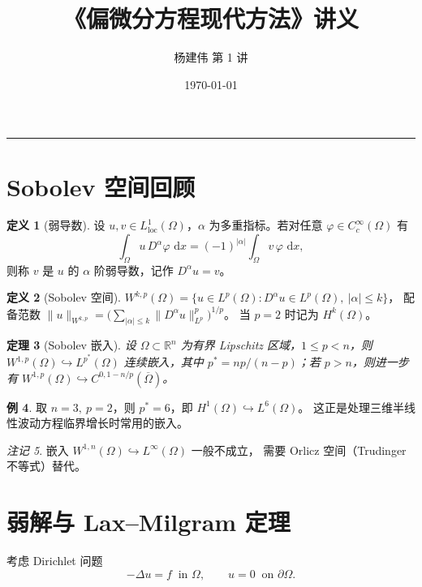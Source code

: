 \documentclass[11pt,a4paper,UTF8,fontset=fandol]{ctexart}
\title{《偏微分方程现代方法》讲义}
\author{杨建伟 \quad 第 1 讲}
\date{\today}
\newtheorem{theorem}{定理}[section]
\theoremstyle{definition}
\newtheorem{definition}[theorem]{定义}
\newtheorem{example}[theorem]{例}
\theoremstyle{remark}
\newtheorem{remark}[theorem]{注记}
\newcommand{\R}{\mathbb{R}}
\newcommand{\Om}{\Omega}
\newcommand{\Lp}[1]{L^{#1}}
\newcommand{\Hs}[1]{H^{#1}}
\newcommand{\dd}{\,\mathrm{d}}
\begin{document}
\maketitle

\tableofcontents
\bigskip\hrule\bigskip

\section{Sobolev 空间回顾}

\begin{definition}[弱导数]
设 $u,v\in L^1_{\mathrm{loc}}(\Om)$，$\alpha$ 为多重指标。若对任意
$\varphi\in C_c^\infty(\Om)$ 有
\begin{equation}\label{eq:weak-deriv}
  \int_{\Om} u\, D^\alpha\varphi\,\dd x
  = (-1)^{|\alpha|}\int_{\Om} v\,\varphi\,\dd x ,
\end{equation}
则称 $v$ 是 $u$ 的 $\alpha$ 阶弱导数，记作 $D^\alpha u=v$。
\end{definition}

\begin{definition}[Sobolev 空间]
$W^{k,p}(\Om)=\{u\in\Lp{p}(\Om): D^\alpha u\in\Lp{p}(\Om),\ |\alpha|\le k\}$，
配备范数 $\|u\|_{W^{k,p}}=\bigl(\sum_{|\alpha|\le k}\|D^\alpha u\|_{\Lp p}^p\bigr)^{1/p}$。
当 $p=2$ 时记为 $\Hs{k}(\Om)$。
\end{definition}

\begin{theorem}[Sobolev 嵌入]\label{thm:embed}
设 $\Om\subset\R^n$ 为有界 Lipschitz 区域，$1\le p<n$，则
$W^{1,p}(\Om)\hookrightarrow\Lp{p^*}(\Om)$ 连续嵌入，其中
$p^*=np/(n-p)$；若 $p>n$，则进一步有
$W^{1,p}(\Om)\hookrightarrow C^{0,1-n/p}(\overline\Om)$。
\end{theorem}

\begin{example}
取 $n=3,\ p=2$，则 $p^*=6$，即 $\Hs1(\Om)\hookrightarrow\Lp6(\Om)$。
这正是处理三维半线性波动方程临界增长时常用的嵌入。
\end{example}

\begin{remark}
嵌入 $W^{1,n}(\Om)\hookrightarrow L^\infty(\Om)$ 一般不成立，
需要 Orlicz 空间（Trudinger 不等式）替代。
\end{remark}

\section{弱解与 Lax--Milgram 定理}

考虑 Dirichlet 问题
\begin{equation}\label{eq:dirichlet}
  -\Delta u = f \ \text{ in } \Om,\qquad u=0 \ \text{ on } \partial\Om .
\end{equation}
\end{document}
